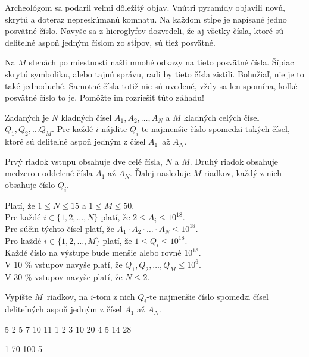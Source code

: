 





Archeológom sa podaril veľmi dôležitý objav. Vnútri pyramídy objavili novú,
skrytú a doteraz nepreskúmanú komnatu. Na každom stĺpe je napísané jedno
posvätné číslo. Navyše sa z hieroglyfov dozvedeli, že aj všetky čísla, ktoré
sú deliteľné aspoň jedným číslom zo stĺpov, sú tiež posvätné.

Na $M$ stenách po miestnosti našli mnohé odkazy na tieto posvätné čísla. Šípiac
skrytú symboliku, alebo tajnú správu, radi by tieto čísla zistili. Bohužiaľ, nie
je to také jednoduché. Samotné čísla totiž nie sú uvedené, vždy sa len spomína,
koľké posvätné číslo to je. Pomôžte im rozriešiť túto záhadu!


Zadaných je $N$ kladných čísel $A_1, A_2, \ldots, A_N$ a $M$ kladných celých čísel
$Q_1, Q_2, \ldots Q_M$. Pre každé $i$ nájdite $Q_i$-te najmenšie číslo spomedzi
takých čísel, ktoré sú deliteľné aspoň jedným z čísel $A_1$ až $A_N$.


Prvý riadok vstupu obsahuje dve celé čísla, $N$ a $M$. Druhý riadok obsahuje
medzerou oddelené čísla $A_1$ až $A_N$. Ďalej nasleduje $M$ riadkov, každý z nich
obsahuje číslo $Q_i$.

\bigskip
\noindent
Platí, že $1 \leq N \leq 15$ a $1 \leq M \leq 50$.\\
Pre každé $i \in \{ 1, 2, \ldots, N \}$ platí, že $2 \leq A_i \leq 10^{18}$.\\
Pre súčin týchto čísel platí, že $A_1 \cdot A_2 \cdot \ldots \cdot A_N \leq 10^{18}$.\\
Pro každé $i \in \{ 1, 2, \ldots, M \}$ platí, že $1 \leq Q_i \leq 10^{18}$.\\
Každé číslo na výstupe bude menšie alebo rovné $10^{18}$.\\
V 10 \% vstupov navyše platí, že $Q_1, Q_2, \ldots, Q_M \leq 10^6$.\\
V 30 \% vstupov navyše platí, že $N \leq 2$.


Vypíšte $M$ riadkov, na $i$-tom z nich $Q_i$-te najmenšie číslo spomedzi
čísel deliteľných aspoň jedným z čísel $A_1$ až $A_N$.


 5
2 5 7 10 11
1
2
3
10
20
4
5
14
28
\sampleEND

 1
70 100
5
\sampleEND


